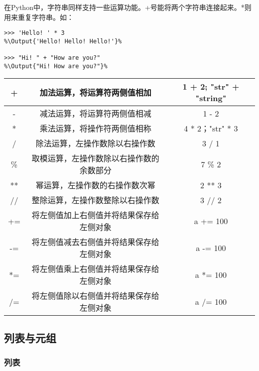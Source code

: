 在Python中，字符串同样支持一些运算功能。+号能将两个字符串连接起来。*则用来重复字符串。如：

\begin{lstlisting}
>>> 'Hello! ' * 3
%\Output{'Hello! Hello! Hello!'}%

>>> "Hi! " + "How are you?"
%\Output{"Hi! How are you?"}%

\end{lstlisting}

\begin{center}
    \tabletail{\hline}
    \tablelasttail{\hline}
    \begin{supertabular}{|c|c|c|}
        \hline
        + & 加法运算，将运算符两侧值相加 & 1 + 2; "str" + "string" \\
        \hline
        - & 减法运算，将运算符两侧值相减 & 1 - 2\\
        \hline
        * & 乘法运算，将操作符两侧值相称 & 4 * 2；"str" * 3\\
        \hline
        / & 除法运算，左操作数除以右操作数 & 3 / 1\\
        \hline
        \% & 取模运算，左操作数除以右操作数的余数部分 & 7 \% 2\\
        \hline
        ** & 幂运算，左操作数的右操作数次幂 & 2 ** 3\\
        \hline
        // & 整除运算，左操作数整除以右操作数& 3 // 2\\
        \hline
        += & 将左侧值加上右侧值并将结果保存给左侧对象 & a += 100\\
        \hline
        -= & 将左侧值减去右侧值并将结果保存给左侧对象 & a -= 100\\
        \hline
        *= & 将左侧值乘上右侧值并将结果保存给左侧对象 & a *= 100\\
        \hline
        /= & 将左侧值除以右侧值并将结果保存给左侧对象 & a /= 100\\
        \hline
    \end{supertabular}
    \label{table:4.1.2}
\end{center}


\subsection{列表与元组}

\subsubsection{列表}

